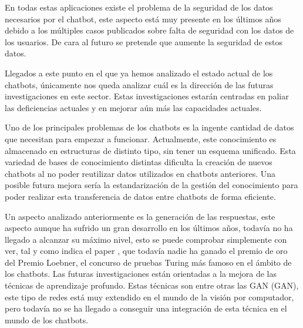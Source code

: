 En todas estas aplicaciones existe el problema de la seguridad de los datos necesarios por el chatbot, este aspecto está muy presente en los últimos años debido a los múltiples casos publicados sobre falta de seguridad con los datos de los usuarios. De cara al futuro se pretende que aumente la seguridad de estos datos.

Llegados a este punto en el que ya hemos analizado el estado actual de los chatbots, únicamente nos queda analizar cuál es la dirección de las futuras investigaciones en este sector. Estas investigaciones estarán centradas en paliar las deficiencias actuales y en mejorar aún más las capacidades actuales.

Uno de los principales problemas de los chatbots es la ingente cantidad de datos que necesitan para empezar a funcionar. Actualmente, este conocimiento es almacenado en estructuras de distinto tipo, sin tener un esquema unificado. Esta variedad de bases de conocimiento distintas dificulta la creación de nuevos chatbots al no poder reutilizar datos utilizados en chatbots anteriores. Una posible futura mejora sería la estandarización de la gestión del conocimiento para poder realizar esta transferencia de datos entre chatbots de forma eficiente.

Un aspecto analizado anteriormente es la generación de las respuestas, este aspecto aunque ha sufrido un gran desarrollo en los últimos años, todavía no ha llegado a alcanzar su máximo nivel, esto se puede comprobar simplemente con ver, tal y como indica el paper \cite{RefWorks:RefID:36-luo2022critical}, que todavía nadie ha ganado el premio de oro del Premio Loebner, el concurso de pruebas Turing más famoso en el ámbito de los chatbots. Las futuras investigaciones están orientadas a la mejora de las técnicas de aprendizaje profundo. Estas técnicas son entre otras las \gls{GAN} (GAN), este tipo de redes está muy extendido en el mundo de la visión por computador, pero todavía no se ha llegado a conseguir una integración de esta técnica en el mundo de los chatbots.

